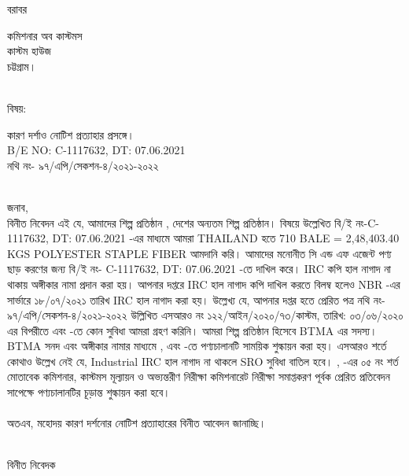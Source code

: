 \documentclass[12pt]{article}
\newcommand{\beno}{C-1117632}
\newcommand{\bedt}{07.06.2021}
\newcommand{\pkg}{710 BALE = 2,48,403.40 KGS}
\newcommand{\good}{POLYESTER STAPLE FIBER}
\newcommand{\impn}{\jsml}
\newcommand{\impadd}{\jsmla}
\begin{document}
\noindent
বরাবর
\\
\begin{minipage}[t]{0.06\linewidth}
\hspace{1em}
\end{minipage}
\begin{minipage}[t]{0.94\linewidth}
কমিশনার অব কাস্টমস
\\
কাস্টম হাউজ
\\
চট্টগ্রাম।
\\
\\
\end{minipage}
\begin{minipage}[t]{0.06\linewidth}
বিষয়:
\end{minipage}
\begin{minipage}[t]{0.94\linewidth}
কারণ দর্শাও নোটিশ প্রত্যাহার প্রসঙ্গে।
\\
B/E NO: {\beno}, DT: {\bedt}
\\
নথি নং- ৯৭/এপি/সেকশন-৪/২০২১-২০২২
\\
\\
\end{minipage}
জনাব,
\\
\hspace*{2.7em}
বিনীত নিবেদন এই যে, আমাদের শিল্প প্রতিষ্ঠান {\impn}, {\impadd}
দেশের অন্যতম শিল্প প্রতিষ্ঠান।
বিষয়ে উল্লেখিত বি/ই নং-{\beno}, DT: {\bedt} -এর মাধ্যমে আমরা THAILAND হতে {\pkg} {\good} আমদানি করি। আমাদের মনোনীত সি এন্ড এফ এজেন্ট {\cnfn} পণ্য ছাড় করণের জন্য
বি/ই নং- {\beno}, DT: {\bedt} -তে দাখিল করে। IRC কপি হাল নাগাদ না থাকায় অঙ্গীকার নামা প্রদান করা হয়।
আপনার দপ্তরে IRC হাল নাগাদ কপি দাখিল
করতে বিলম্ব হলেও NBR -এর
সার্ভারে ১৮/০৭/২০২১ তারিখ
IRC হাল নাগাদ করা হয়।
উল্লেখ্য যে, আপনার দপ্তর হতে প্রেরিত
পত্র
নথি নং- ৯৭/এপি/সেকশন-৪/২০২১-২০২২
উল্লিখিত এসআরও নং ১২২/আইন/২০২০/৭৩/কাস্টম,
তারিখ: ০৩/০৬/২০২০ এর বিপরীতে এবং
{\cpcfzo} -তে কোন সুবিধা আমরা গ্রহণ করিনি।
আমরা শিল্প প্রতিষ্ঠান হিসেবে BTMA
এর সদস্য। BTMA সনদ এবং
অঙ্গীকার নামার মাধ্যমে {\srootz}, {\srootzd}
এবং {\cpcofs} -তে
পণ্যচালানটি সাময়িক শুল্কায়ন করা হয়।
এসআরও শর্তে কোথাও উল্লেখ নেই যে,
Industrial IRC হাল নাগাদ না থাকলে
SRO সুবিধা
বাতিল হবে।
 {\srootz}, {\srootzd} -এর
০৫ নং শর্ত মোতাবেক কমিশনার,
কাস্টমস মূল্যায়ন ও অভ্যন্তরীণ
নিরীক্ষা কমিশনারেট নিরীক্ষা
সমাপ্তকরণ পূর্বক প্রেরিত প্রতিবেদন সাপেক্ষে পণ্যচালানটির চূড়ান্ত শুল্কায়ন
করা হবে।
\\
\\
অতএব, মহোদয় কারণ দর্শনোর নোটিশ প্রত্যাহারের বিনীত আবেদন জানাচ্ছি।
\\
\\
\begin{minipage}[t]{0.55\linewidth}
\hspace{1em}
\end{minipage}
\begin{minipage}[t]{0.45\linewidth}
বিনীত নিবেদক
\\
\\
\\
\\
{\jsml}
\end{minipage}
\thispagestyle{laststyle}
\end{document}
